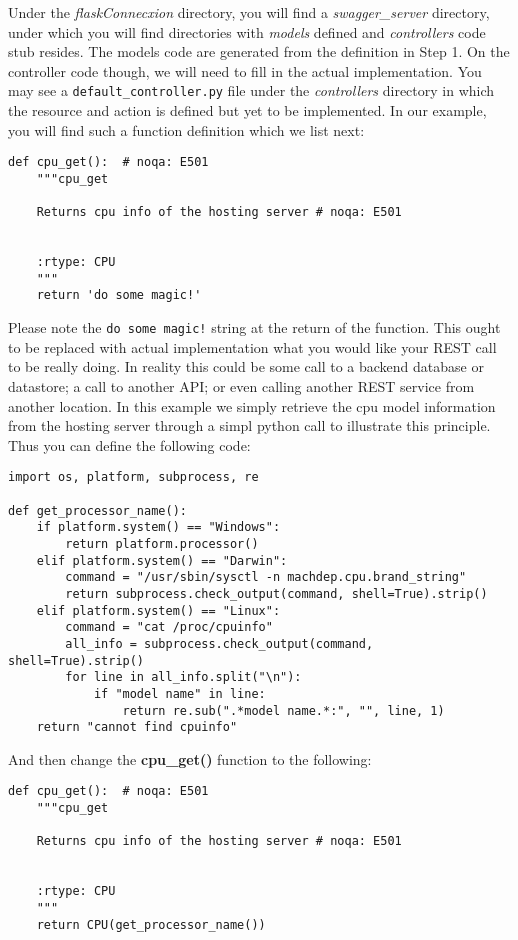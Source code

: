 Under the \emph{flaskConnecxion} directory, you will find a
\emph{swagger\_server} directory, under which you will find directories
with \emph{models} defined and \emph{controllers} code stub resides. The
models code are generated from the definition in Step 1. On the
controller code though, we will need to fill in the actual
implementation. You may see a \texttt{default\_controller.py} file under
the \emph{controllers} directory in which the resource and action is
defined but yet to be implemented. In our example, you will find such a
function definition which we list next:

\begin{verbatim}
def cpu_get():  # noqa: E501
    """cpu_get

    Returns cpu info of the hosting server # noqa: E501


    :rtype: CPU
    """
    return 'do some magic!'
\end{verbatim}

Please note the \texttt{do\ some\ magic!} string at the return of the
function. This ought to be replaced with actual implementation what you
would like your REST call to be really doing. In reality this could be
some call to a backend database or datastore; a call to another API; or
even calling another REST service from another location. In this example
we simply retrieve the cpu model information from the hosting server
through a simpl python call to illustrate this principle. Thus you can
define the following code:

\begin{verbatim}
import os, platform, subprocess, re

def get_processor_name():
    if platform.system() == "Windows":
        return platform.processor()
    elif platform.system() == "Darwin":
        command = "/usr/sbin/sysctl -n machdep.cpu.brand_string"
        return subprocess.check_output(command, shell=True).strip()
    elif platform.system() == "Linux":
        command = "cat /proc/cpuinfo"
        all_info = subprocess.check_output(command, shell=True).strip()
        for line in all_info.split("\n"):
            if "model name" in line:
                return re.sub(".*model name.*:", "", line, 1)
    return "cannot find cpuinfo"
\end{verbatim}

And then change the \textbf{cpu\_get()} function to the following:

\begin{verbatim}
def cpu_get():  # noqa: E501
    """cpu_get

    Returns cpu info of the hosting server # noqa: E501


    :rtype: CPU
    """
    return CPU(get_processor_name())
\end{verbatim}

